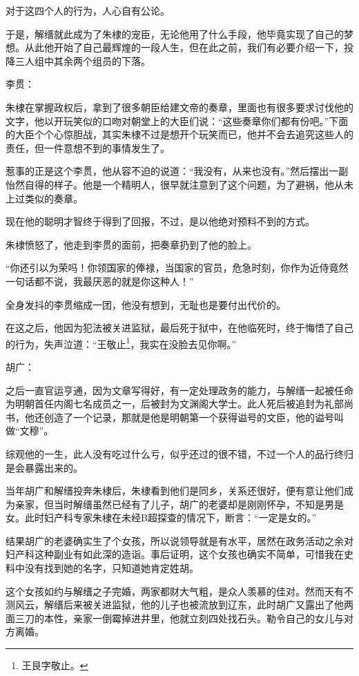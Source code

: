 \begin{multicols}{\theparacolNo}
对于这四个人的行为，人心自有公论。

于是，解缙就此成为了朱棣的宠臣，无论他用了什么手段，他毕竟实现了自己的梦想。从此他开始了自己最辉煌的一段人生，但在此之前，我们有必要介绍一下，投降三人组中其余两个组员的下落。

李贯：

朱棣在掌握政权后，拿到了很多朝臣给建文帝的奏章，里面也有很多要求讨伐他的文字，他以开玩笑似的口吻对朝堂上的大臣们说：“这些奏章你们都有份吧。”下面的大臣个个心惊胆战，其实朱棣不过是想开个玩笑而已，他并不会去追究这些人的责任，但一件意想不到的事情发生了。

惹事的正是这个李贯，他从容不迫的说道：“我没有，从来也没有。”然后摆出一副怡然自得的样子。他是一个精明人，很早就注意到了这个问题，为了避祸，他从未上过类似的奏章。

现在他的聪明才智终于得到了回报，不过，是以他绝对预料不到的方式。

朱棣愤怒了，他走到李贯的面前，把奏章扔到了他的脸上。

“你还引以为荣吗！你领国家的俸禄，当国家的官员，危急时刻，你作为近侍竟然一句话都不说，我最厌恶的就是你这种人！”

全身发抖的李贯缩成一团，他没有想到，无耻也是要付出代价的。

在这之后，他因为犯法被关进监狱，最后死于狱中，在他临死时，终于悔悟了自己的行为，失声泣道：“王敬止\footnote{王艮字敬止。}，我实在没脸去见你啊。”

胡广：

之后一直官运亨通，因为文章写得好，有一定处理政务的能力，与解缙一起被任命为明朝首任内阁七名成员之一，后被封为文渊阁大学士。此人死后被追封为礼部尚书，他还创造了一个记录，那就是他是明朝第一个获得谥号的文臣，他的谥号叫做“文穆”。

综观他的一生，此人没有吃过什么亏，似乎还过的很不错，不过一个人的品行终归是会暴露出来的。

当年胡广和解缙投奔朱棣后，朱棣看到他们是同乡，关系还很好，便有意让他们成为亲家，但当时解缙虽然已经有了儿子，胡广的老婆却是刚刚怀孕，不知是男是女。此时妇产科专家朱棣在未经B超探查的情况下，断言：“一定是女的。”

结果胡广的老婆确实生了个女孩，所以说领导就是有水平，居然在政务活动之余对妇产科这种副业有如此深的造诣。事后证明，这个女孩也确实不简单，可惜我在史料中没有找到她的名字，只知道她肯定姓胡。

这个女孩如约与解缙之子完婚，两家都财大气粗，是众人羡慕的佳对。然而天有不测风云，解缙后来被关进监狱，他的儿子也被流放到辽东，此时胡广又露出了他两面三刀的本性，亲家一倒霉掉进井里，他就立刻四处找石头。勒令自己的女儿与对方离婚。


\end{multicols}
